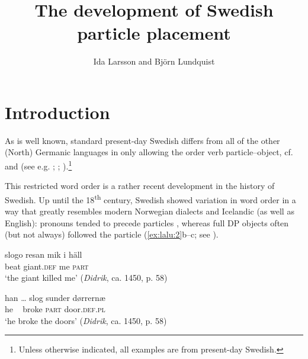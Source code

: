 \documentclass[output=paper]{langscibook}
\author{Ida Larsson\orcid{}\affiliation{Østfold University College, Halden} and Björn Lundquist\affiliation{The Arctic University of Norway, Tromsø}}
\title{The development of Swedish particle placement}
\begin{document}
\maketitle 

\section{Introduction}\label{sec:lalu:1}

\begin{sloppypar}
As is well known, standard present-day Swedish differs from all of the other (North) Germanic languages in only allowing the order verb particle–object, cf.  and  (see e.g. \citealt{Svenonius1996, Svenonius2003, Svenonius1996}; \citealt{Toivonen2003}; \citealt{Lundquist2014Active}).\footnote{Unless otherwise indicated, all examples are from present-day Swedish.}
\end{sloppypar}

\ea\label{ex:lalu:1}
\z
\z


This restricted word order is a rather recent development in the history of Swedish. Up until the 18\textsuperscript{th} century, Swedish showed variation in word order in a way that greatly resembles modern Norwegian dialects and Icelandic (as well as English): pronouns tended to precede particles , whereas full DP objects often (but not always) followed the particle (\ref{ex:lalu:2}b–c; see \citealt{LarssonLundquist2014}).


\ea\label{ex:lalu:2}
\ea\label{ex:lalu:2a}
\gll  slogo  resan       mik     {i häll}\\
 beat     giant.\textsc{def}   me     \textsc{part}\\
  \glt `the giant killed me’ (\textit{Didrik}, ca. 1450, p. 58)

\ex   \label{ex:lalu:2b}
\gll han …   slog  sunder   dørrernæ\\
      he  ~           broke  \textsc{part}       door\textsc{.def.pl}\\
  \glt   ‘he broke the doors’ (\textit{Didrik}, ca. 1450, p. 58)
\end{document}
